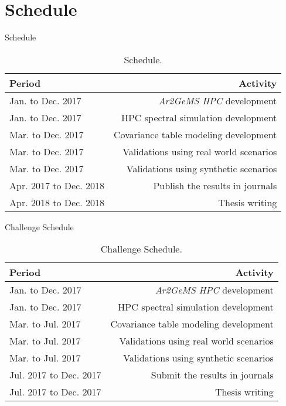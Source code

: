 \section{Schedule}
\begin{frame}{Schedule}

\centering
\begin{table}
\centering
\begin{tabular}{l|r}
Period & Activity \\\hline
Jan. to Dec. 2017 & \textit{Ar2GeMS HPC} development \\
Jan. to Dec. 2017 & HPC spectral simulation development \\
Mar. to Dec. 2017 & Covariance table modeling development \\
Mar. to Dec. 2017 & Validations using real world scenarios \\
Mar. to Dec. 2017 & Validations using synthetic scenarios \\
Apr. 2017 to Dec. 2018 & Publish the results in journals  \\
Apr. 2018 to Dec. 2018 & Thesis writing 
\end{tabular}
\caption{\label{tab:widgets}Schedule.}
\end{table}


\end{frame}


\begin{frame}{Challenge Schedule}

\centering
\begin{table}
\centering
\begin{tabular}{l|r}
Period & Activity \\\hline
Jan. to Dec. 2017 & \textit{Ar2GeMS HPC} development \\
Jan. to Dec. 2017 & HPC spectral simulation development \\
Mar. to Jul. 2017 & Covariance table modeling development \\
Mar. to Jul. 2017 & Validations using real world scenarios \\
Mar. to Jul. 2017 & Validations using synthetic scenarios \\
Jul. 2017 to Dec. 2017 & Submit the results in journals  \\
Jul. 2017 to Dec. 2017 & Thesis writing 
\end{tabular}
\caption{\label{tab:widgets}Challenge Schedule.}
\end{table}


\end{frame}